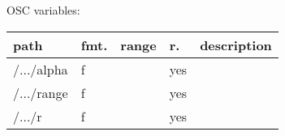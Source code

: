 \begin{snugshade}
{\footnotesize
\label{osctab:tascarapfence}
OSC variables:
\nopagebreak

\begin{tabularx}{\textwidth}{llllX}
\hline
path & fmt. & range & r. & description\\
\hline
/.../alpha & f &  & yes & \\
/.../range & f &  & yes & \\
/.../r & f &  & yes & \\
\hline
\end{tabularx}
}
\end{snugshade}

